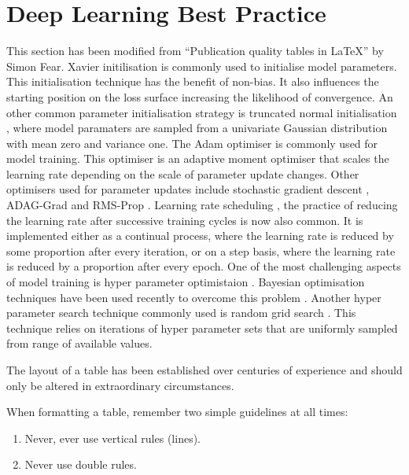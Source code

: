 \section{Deep Learning Best Practice}
This section has been modified from ``Publication quality tables in \LaTeX*''
 by Simon Fear. \newline
 Xavier initilisation \cite{reference} is commonly used to initialise model parameters. This initialisation technique has the benefit of non-bias. It also influences the starting position on the loss surface increasing the likelihood of convergence. An other common parameter initialisation strategy is truncated normal initialisation \cite{reference}, where model paramaters are sampled from a univariate Gaussian distribution with mean zero and variance one. \newline
The Adam \cite{reference} optimiser is commonly used for model training. This optimiser is an adaptive moment optimiser that scales the learning rate depending on the scale of parameter update changes. Other optimisers used for parameter updates include stochastic gradient descent \cite{reference}, ADAG-Grad \cite {reference} and RMS-Prop \cite{reference}. \newline
Learning rate scheduling \cite{reference}, the practice of reducing the learning rate after successive training cycles is now also common. It is implemented either as a continual process, where the learning rate is reduced by some proportion after every iteration, or on a step basis, where the learning rate is reduced by a proportion after every epoch. \newline
One of the most challenging aspects of model training is hyper parameter optimistaion \cite{reference}. Bayesian optimisation techniques have been used recently to overcome this problem \cite{reference}. Another hyper parameter search technique commonly used is random grid search \cite{reference}. This technique relies on iterations of hyper parameter sets that are uniformly sampled from range of available values. \newline

The layout of a table has been established over centuries of experience and 
should only be altered in extraordinary circumstances. 

When formatting a table, remember two simple guidelines at all times:

\begin{enumerate}
  \item Never, ever use vertical rules (lines).
  \item Never use double rules.
\end{enumerate}

